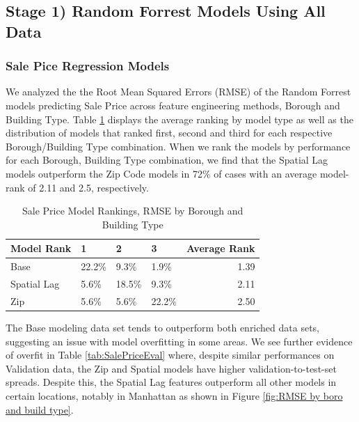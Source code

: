 \documentclass[12pt,]{article}
\begin{document}
\hypertarget{stage-1-random-forrest-models-using-all-data}{%
\subsection{Stage 1) Random Forrest Models Using All
Data}\label{stage-1-random-forrest-models-using-all-data}}

\hypertarget{sale-pice-regression-models}{%
\subsubsection{Sale Pice Regression
Models}\label{sale-pice-regression-models}}

We analyzed the the Root Mean Squared Errors (RMSE) of the Random
Forrest models predicting Sale Price across feature engineering methods,
Borough and Building Type. Table \ref{tab:SalePriceModelRank} displays
the average ranking by model type as well as the distribution of models
that ranked first, second and third for each respective Borough/Building
Type combination. When we rank the models by performance for each
Borough, Building Type combination, we find that the Spatial Lag models
outperform the Zip Code models in 72\% of cases with an average
model-rank of 2.11 and 2.5, respectively.

\begin{table}

\caption{\label{tab:Sale Price Model Rank Distributions}\label{tab:SalePriceModelRank} Sale Price Model Rankings, RMSE by Borough and Building Type}
\centering
\begin{tabular}[t]{llllr}
\toprule
Model Rank & 1 & 2 & 3 & Average Rank\\
\midrule
Base & 22.2\% & 9.3\% & 1.9\% & 1.39\\
Spatial Lag & 5.6\% & 18.5\% & 9.3\% & 2.11\\
Zip & 5.6\% & 5.6\% & 22.2\% & 2.50\\
\bottomrule
\end{tabular}
\end{table}

The Base modeling data set tends to outperform both enriched data sets,
suggesting an issue with model overfitting in some areas. We see further
evidence of overfit in Table \ref{tab:SalePriceEval} where, despite
similar performances on Validation data, the Zip and Spatial models have
higher validation-to-test-set spreads. Despite this, the Spatial Lag
features outperform all other models in certain locations, notably in
Manhattan as shown in Figure \ref{fig:RMSE by boro and build type}.
\end{document}
